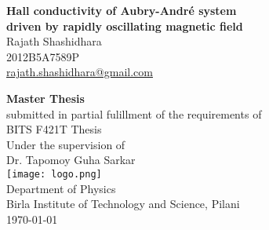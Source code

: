 %

\begin{titlepage}
  \begin{center}
    \vspace*{1cm}
    
    \LARGE
    \textbf{Hall conductivity of Aubry-Andr\'e system \\driven by rapidly oscillating magnetic field}
    \vspace{1.5cm}
    \large
    \\ Rajath Shashidhara\\    
    2012B5A7589P\\ \normalsize
    \url{rajath.shashidhara@gmail.com}
    
    \vspace{3.5cm}
    \large
    \textbf{Master Thesis} \\
    \vspace{0.4cm}
    submitted in partial fulillment of the requirements of\\
    BITS F421T Thesis\\
    
    \normalsize
    \vspace{2.5cm}
    Under the supervision of\\
    \vspace{0.2cm}
    \large
    Dr. Tapomoy Guha Sarkar\\
    
    \normalsize
    \vfill
    \texttt{[image: logo.png]}
    \vspace{0.5cm}\\
    Department of Physics\\
    Birla Institute of Technology and Science, Pilani\\
    \today
  \end{center}
\end{titlepage}

\normalsize

\newpage
\thispagestyle{empty}

\begin{abstract}
Study of quantum hall effect in 2D square lattice driven by oscillatory magnetic field perpendicular to the plane.
The time-dependent hamiltonian is solved in fourier space using Brillouin-Wigner perturbation theory, in the high frequency limit.
Investigation of localization/delocalization transitions of time-averaged wavefunctions and calculation of hall conductivity of 
the system using TKNN invariant. Comparison of the results with the effective static hamiltonian picture carried out in the 
previous work.
\end{abstract}

